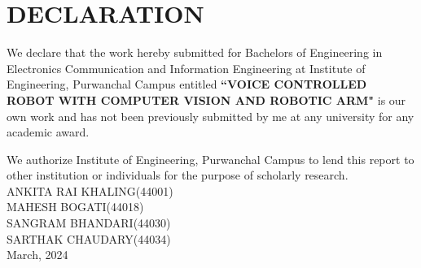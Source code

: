 \chapter*{DECLARATION}
We declare that the work hereby submitted for Bachelors of Engineering in Electronics Communication and Information Engineering at Institute of Engineering, Purwanchal Campus entitled \textbf{``VOICE CONTROLLED ROBOT WITH COMPUTER VISION AND ROBOTIC ARM"} is our own work and has not been previously submitted by me at any university for any academic award.

We authorize Institute of Engineering, Purwanchal Campus to lend this report to other institution or individuals for the purpose of scholarly research.
\vspace{1cm}\\
ANKITA RAI KHALING(44001)\\
MAHESH BOGATI(44018)\\
SANGRAM BHANDARI(44030)\\
SARTHAK CHAUDARY(44034)\\

March, 2024